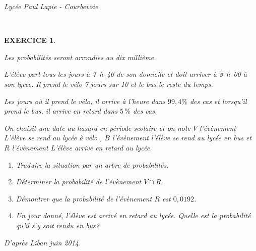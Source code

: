 \documentclass[a4paper]{article}   %
\renewcommand{\(}{\left(}
\renewcommand{\)}{\right)}
\newtheorem{EXO}{\large EXERCICE }
\newenvironment{EX}   { \setcounter{ques}{0} \begin{EXO} \hrulefill ~\vspace{0.3cm}

\normalfont}    {\end{EXO} \medskip}
\def\cl{{\large \bf{1èreG1}}}
\begin{document}
\newpage \setcounter{EXO}{0}

\noindent\begin{minipage}{.20\linewidth}\begin{center}                  
\noindent \emph{Lycée Paul Lapie - Courbevoie}
\end{center}\end{minipage}
\begin{minipage}{1.5\linewidth}\begin{center}	
\noindent \cl\\ 
\end{center}\end{minipage}

\begin{center} 	
\end{center}
\normalsize

\begin{EX}
\emph{Les probabilités seront arrondies au dix millième.}

\medskip
L'élève part tous les jours à 7~h~40 de son domicile et doit arriver à 8~h~00 à son lycée. Il prend le vélo 7 jours sur 10 et le bus le reste du temps.

Les jours où il prend le vélo, il arrive à l'heure dans $99,4\%$ des cas et lorsqu'il prend le bus, il arrive en retard dans $5\,\%$ des cas.

On choisit une date au hasard en période scolaire et on note $V$ l'évènement 
\og L'élève se rend au lycée à vélo \fg, $B$ l'évènement \og l'élève se rend au lycée en bus \fg{} et $R$ l'évènement \og L'élève arrive en retard au lycée\fg.
\begin{enumerate}
\item Traduire la situation par un arbre de probabilités.
\item Déterminer la probabilité de l'évènement $V \cap R$.
\item Démontrer que la probabilité de l'évènement $R$ est $0,0192$.
\item Un jour donné, l'élève est arrivé en retard au lycée. Quelle est la probabilité qu'il s'y soit rendu en bus?
\end{enumerate}
\hfill \emph{D'après Liban juin 2014.}
\end{EX}
\end{document}
